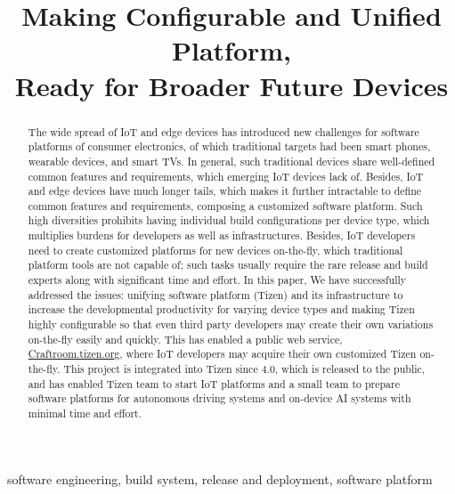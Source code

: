 \documentclass[10pt,conference,letterpaper]{IEEEtran}
\begin{document}
\title{Making Configurable and Unified Platform, \\
Ready for Broader Future Devices}

\author{
\IEEEauthorblockA{\textit{Samsung Research, Samsung Electronics} \\
Seoul, Republic of Korea \\
\{myungjoo.ham, geunsik.lim\}@samsung.com}
}
\maketitle

\begin{abstract}
The wide spread of IoT and edge devices has introduced new challenges for software platforms of consumer electronics, of which traditional targets had been smart phones, wearable devices, and smart TVs.
In general, such traditional devices share well-defined common features and requirements, which emerging IoT devices lack of.
Besides, IoT and edge devices have much longer tails, which makes it further intractable to define common features and requirements, composing a customized software platform.
Such high diversities prohibits having individual build configurations per device type, which multiplies burdens for developers as well as infrastructures.
Besides, IoT developers need to create customized platforms for new devices on-the-fly, which traditional platform tools are not capable of; such tasks usually require the rare release and build experts along with significant time and effort.
In this paper, We have successfully addressed the issues: unifying software platform (Tizen) and its infrastructure to increase the developmental productivity for varying device types and making Tizen highly configurable so that even third party developers may create their own variations on-the-fly easily and quickly.
This has enabled a public web service, \url{Craftroom.tizen.org}, where IoT developers may acquire their own customized Tizen on-the-fly.
This project is integrated into Tizen since 4.0, which is released to the public, and has enabled Tizen team to start IoT platforms and a small team to prepare software platforms for autonomous driving systems and on-device AI systems with minimal time and effort.
\end{abstract}

\begin{IEEEkeywords}
software engineering, build system, release and deployment, software platform
\end{IEEEkeywords}
\end{document}
